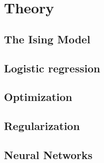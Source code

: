 
\section{Theory}
\subsection{The Ising Model}


\subsection{Logistic regression}


% 

\subsection{Optimization}


\subsection{Regularization}


\subsection{Neural Networks}

